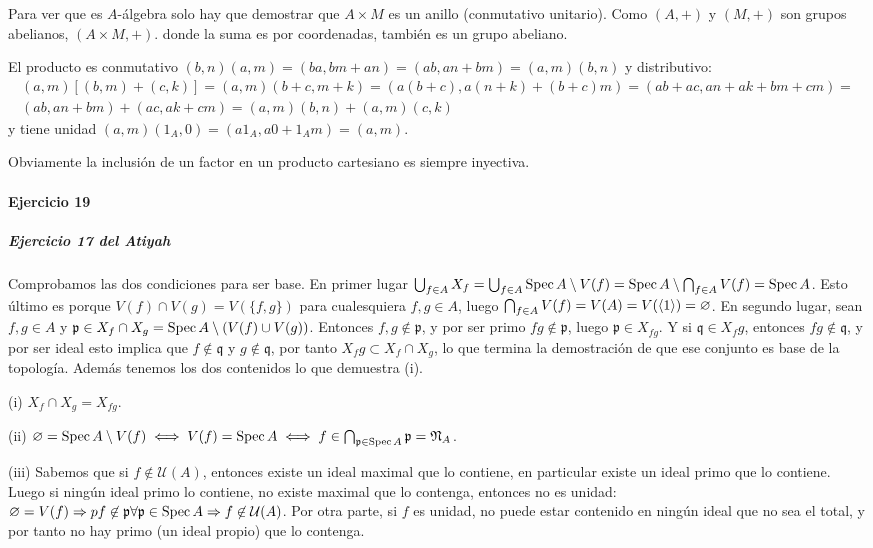 \documentclass[../main.tex]{subfiles}
\begin{document}
Para ver que es $A$-álgebra solo hay que demostrar que $A\times M$ es un anillo (conmutativo unitario). Como $(A,+)$ y $(M,+)$ son grupos abelianos, $(A\times M, +)$. donde la suma es por coordenadas, también es un grupo abeliano.

El producto es conmutativo $(b,n)(a,m) = (ba,bm+an) = (ab,an+bm) = (a,m)(b,n)$ y distributivo:
\begin{multline}
  (a,m)[(b,m)+(c,k)]=(a,m)(b+c,m+k) = \left(a(b+c),a(n+k)+(b+c)m\right) = (ab+ac,an+ak+bm+cm) =\\ (ab,an+bm)+(ac,ak+cm) = (a,m)(b,n)+(a,m)(c,k)
\end{multline}
y tiene unidad $(a,m)(1_A,0) = (a1_A,a0+1_A m) = (a,m)$.


Obviamente la inclusión de un factor en un producto cartesiano es siempre inyectiva.

\paragraph{Ejercicio 19}

\subparagraph{Ejercicio 17 del Atiyah}

Comprobamos las dos condiciones para ser base. En primer lugar $\bigcup_{f\in A}X_f = \bigcup_{f\in A}\operatorname{Spec} A \setminus V(f) = \operatorname{Spec} A \setminus \bigcap_{f\in A}V(f) = \operatorname{Spec} A$. Esto último es porque $V(f)\cap V(g) = V(\{f,g\})$ para cualesquiera $f,g \in A$, luego $\bigcap_{f\in A}V(f) = V(A) = V(\langle 1 \rangle) = \varnothing$. En segundo lugar, sean $f, g \in A$ y $\mathfrak p \in X_f\cap X_g = \operatorname{Spec} A \setminus (V(f) \cup V(g))$. Entonces $f, g\not\in \mathfrak p$, y por ser primo $fg \not \in \mathfrak p$, luego $\mathfrak p \in X_{fg}$. Y si $\mathfrak q \in X_fg$, entonces $fg \not \in \mathfrak q$, y por ser ideal esto implica que $f \not \in \mathfrak q$ y $g \not \in \mathfrak q$, por tanto $X_fg \subset X_f \cap X_g$, lo que termina la demostración de que ese conjunto es base de la topología. Además tenemos los dos contenidos lo que demuestra (i).

(i) $X_f \cap X_g = X_{fg}$.

(ii) $\varnothing = \operatorname{Spec} A \setminus V(f) \iff V(f) = \operatorname{Spec} A \iff f \in \bigcap_{\mathfrak p \in \operatorname{Spec} A} \mathfrak p = \mathfrak N_A$.

(iii) Sabemos que si $f\not\in \mathcal U(A)$, entonces existe un ideal maximal que lo contiene, en particular existe un ideal primo que lo contiene. Luego si ningún ideal primo lo contiene, no existe maximal que lo contenga, entonces no es unidad:  $\varnothing = V(f) \Rightarrow pf \not \in \mathfrak p \forall \mathfrak p \in \operatorname{Spec} A \Rightarrow f \not\in \mathcal U(A)$. Por otra parte, si $f$ es unidad, no puede estar contenido en ningún ideal que no sea el total, y por tanto no hay primo (un ideal propio) que lo contenga.
\end{document}
